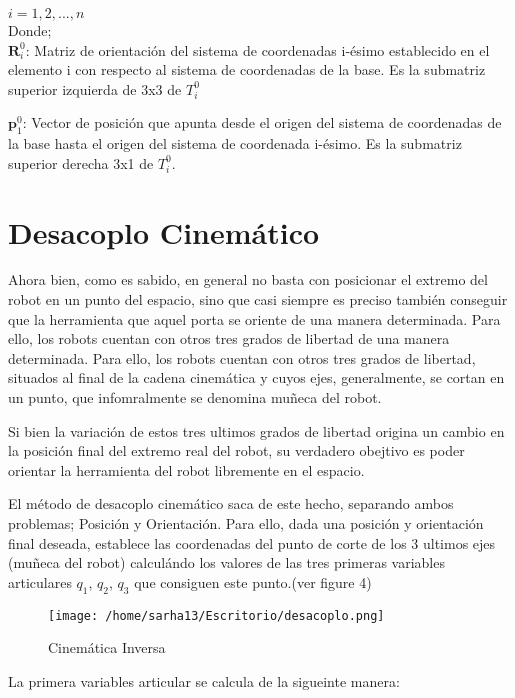 \documentclass[letter,openright,12pt,spanish]{report}
\begin{document}
$i=1,2,...,n$\\

Donde;\\

$\textbf{R}^0_i$:  Matriz de orientaci\'on del sistema de coordenadas i-\'esimo establecido en el elemento i con respecto al sistema de coordenadas de la base. Es la submatriz superior izquierda de 3x3 de $T^0_i$

$\textbf{p}^0_1$: Vector de posici\'on que apunta desde el origen del sistema de coordenadas de la base hasta el origen del sistema de coordenada i-\'esimo. Es la submatriz superior derecha 3x1 de $T^0_i$.

\section{Desacoplo Cinem\'atico}

Ahora bien, como es sabido, en general no basta con posicionar el extremo del robot en un punto del espacio, sino que casi siempre es preciso tambi\'en conseguir que la herramienta que aquel porta se oriente de una manera determinada. Para ello, los robots cuentan con otros tres grados de libertad de una manera determinada. Para ello, los robots cuentan con otros tres grados de libertad, situados al final de la cadena cinem\'atica y cuyos ejes, generalmente, se cortan en un punto, que infomralmente se denomina mu\~neca del robot.

Si bien la variaci\'on de estos tres ultimos grados de libertad origina un cambio en la posici\'on final del extremo real del robot, su verdadero obejtivo es poder orientar la herramienta del robot libremente en el espacio.

El m\'etodo de desacoplo cinem\'atico saca de este hecho, separando ambos problemas; Posici\'on y Orientaci\'on. Para ello, dada una posici\'on y orientaci\'on final deseada, establece las coordenadas del punto de corte de los 3 ultimos ejes (mu\~neca del robot) calcul\'ando los valores de las tres primeras variables articulares $q_1$, $q_2$, $q_3$ que consiguen este punto.(ver figure 4)\\

\begin{figure}[htp]
\centering
\texttt{[image: /home/sarha13/Escritorio/desacoplo.png]}
\caption{Cinem\'atica Inversa}
\label{Figura 4}
\end{figure}

La primera variables articular se calcula de la sigueinte manera:
\end{document}
